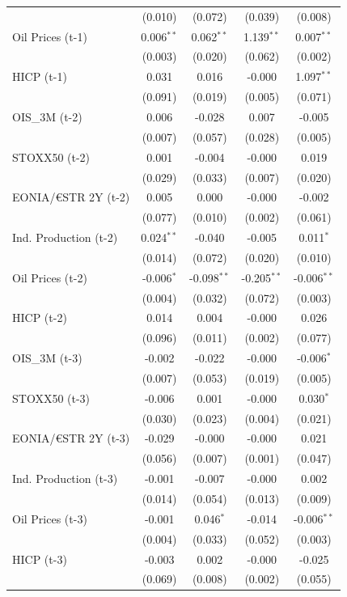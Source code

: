 \begin{longtable}[t]{lcccc}
 & (0.010) & (0.072) & (0.039) & (0.008)\\
Oil Prices (t-1) & 0.006$^{**}$ & 0.062$^{**}$ & 1.139$^{**}$ & 0.007$^{**}$\\
 & (0.003) & (0.020) & (0.062) & (0.002)\\
HICP (t-1) & 0.031 & 0.016 & -0.000 & 1.097$^{**}$\\
 & (0.091) & (0.019) & (0.005) & (0.071)\\
OIS\_3M (t-2) & 0.006 & -0.028 & 0.007 & -0.005\\
 & (0.007) & (0.057) & (0.028) & (0.005)\\
STOXX50 (t-2) & 0.001 & -0.004 & -0.000 & 0.019\\
 & (0.029) & (0.033) & (0.007) & (0.020)\\
EONIA/€STR 2Y (t-2) & 0.005 & 0.000 & -0.000 & -0.002\\
 & (0.077) & (0.010) & (0.002) & (0.061)\\
Ind. Production (t-2) & 0.024$^{**}$ & -0.040 & -0.005 & 0.011$^{*}$\\
 & (0.014) & (0.072) & (0.020) & (0.010)\\
Oil Prices (t-2) & -0.006$^{*}$ & -0.098$^{**}$ & -0.205$^{**}$ & -0.006$^{**}$\\
 & (0.004) & (0.032) & (0.072) & (0.003)\\
HICP (t-2) & 0.014 & 0.004 & -0.000 & 0.026\\
 & (0.096) & (0.011) & (0.002) & (0.077)\\
OIS\_3M (t-3) & -0.002 & -0.022 & -0.000 & -0.006$^{*}$\\
 & (0.007) & (0.053) & (0.019) & (0.005)\\
STOXX50 (t-3) & -0.006 & 0.001 & -0.000 & 0.030$^{*}$\\
 & (0.030) & (0.023) & (0.004) & (0.021)\\
EONIA/€STR 2Y (t-3) & -0.029 & -0.000 & -0.000 & 0.021\\
 & (0.056) & (0.007) & (0.001) & (0.047)\\
Ind. Production (t-3) & -0.001 & -0.007 & -0.000 & 0.002\\
 & (0.014) & (0.054) & (0.013) & (0.009)\\
Oil Prices (t-3) & -0.001 & 0.046$^{*}$ & -0.014 & -0.006$^{**}$\\
 & (0.004) & (0.033) & (0.052) & (0.003)\\
HICP (t-3) & -0.003 & 0.002 & -0.000 & -0.025\\
 & (0.069) & (0.008) & (0.002) & (0.055)\\

\end{longtable}
